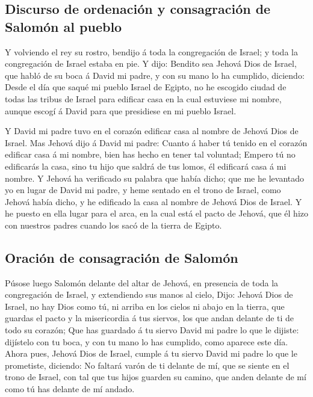 \hypertarget{discurso-de-ordenaciuxf3n-y-consagraciuxf3n-de-salomuxf3n-al-pueblo}{%
\subsection{Discurso de ordenación y consagración de Salomón al
pueblo}\label{discurso-de-ordenaciuxf3n-y-consagraciuxf3n-de-salomuxf3n-al-pueblo}}

 Y volviendo el rey su rostro, bendijo á toda la
congregación de Israel; y toda la congregación de Israel estaba en pie.
 Y dijo: Bendito sea Jehová Dios de Israel, que habló de
su boca á David mi padre, y con su mano lo ha cumplido, diciendo:
 Desde el día que saqué mi pueblo Israel de Egipto, no he
escogido ciudad de todas las tribus de Israel para edificar casa en la
cual estuviese mi nombre, aunque escogí á David para que presidiese en
mi pueblo Israel.

 Y David mi padre tuvo en el corazón edificar casa al
nombre de Jehová Dios de Israel.  Mas Jehová dijo á David
mi padre: Cuanto á haber tú tenido en el corazón edificar casa á mi
nombre, bien has hecho en tener tal voluntad;  Empero tú
no edificarás la casa, sino tu hijo que saldrá de tus lomos, él
edificará casa á mi nombre.  Y Jehová ha verificado su
palabra que había dicho; que me he levantado yo en lugar de David mi
padre, y heme sentado en el trono de Israel, como Jehová había dicho, y
he edificado la casa al nombre de Jehová Dios de Israel. 
Y he puesto en ella lugar para el arca, en la cual está el pacto de
Jehová, que él hizo con nuestros padres cuando los sacó de la tierra de
Egipto.

\hypertarget{oraciuxf3n-de-consagraciuxf3n-de-salomuxf3n}{%
\subsection{Oración de consagración de
Salomón}\label{oraciuxf3n-de-consagraciuxf3n-de-salomuxf3n}}

 Púsose luego Salomón delante del altar de Jehová, en
presencia de toda la congregación de Israel, y extendiendo sus manos al
cielo,  Dijo: Jehová Dios de Israel, no hay Dios como tú,
ni arriba en los cielos ni abajo en la tierra, que guardas el pacto y la
misericordia á tus siervos, los que andan delante de ti de todo su
corazón;  Que has guardado á tu siervo David mi padre lo
que le dijiste: dijístelo con tu boca, y con tu mano lo has cumplido,
como aparece este día.  Ahora pues, Jehová Dios de
Israel, cumple á tu siervo David mi padre lo que le prometiste,
diciendo: No faltará varón de ti delante de mí, que se siente en el
trono de Israel, con tal que tus hijos guarden su camino, que anden
delante de mí como tú has delante de mí andado.

